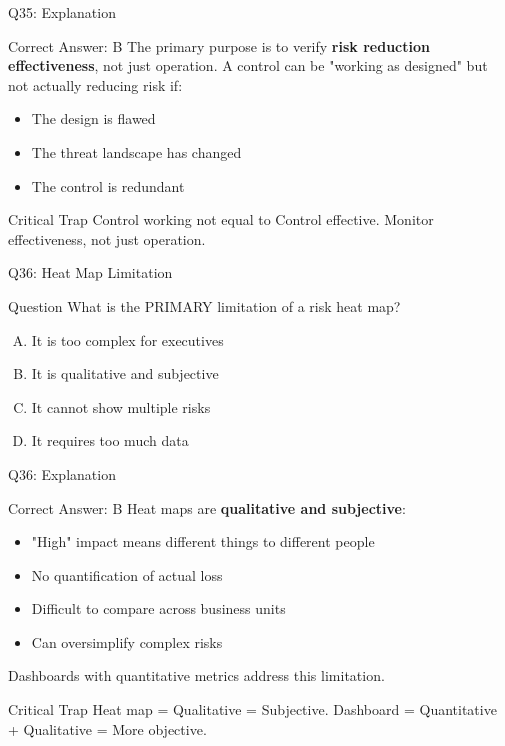 \documentclass{beamer}
\begin{document}
	\begin{frame}{Q35: Explanation}
		\begin{block}{Correct Answer: B}
			The primary purpose is to verify \textbf{risk reduction effectiveness}, not just operation. A control can be "working as designed" but not actually reducing risk if:
			\begin{itemize}
				\item The design is flawed
				\item The threat landscape has changed
				\item The control is redundant
			\end{itemize}
		\end{block}
		\begin{alertblock}{Critical Trap}
			Control working not equal to Control effective.
			Monitor effectiveness, not just operation.
		\end{alertblock}
	\end{frame}
	
	\begin{frame}{Q36: Heat Map Limitation}
		\begin{block}{Question}
			What is the PRIMARY limitation of a risk heat map?
		\end{block}
		\begin{enumerate}[(A)]
			\item It is too complex for executives
			\item It is qualitative and subjective
			\item It cannot show multiple risks
			\item It requires too much data
		\end{enumerate}
	\end{frame}
	
	\begin{frame}{Q36: Explanation}
		\begin{block}{Correct Answer: B}
			Heat maps are \textbf{qualitative and subjective}:
			\begin{itemize}
				\item "High" impact means different things to different people
				\item No quantification of actual loss
				\item Difficult to compare across business units
				\item Can oversimplify complex risks
			\end{itemize}
			Dashboards with quantitative metrics address this limitation.
		\end{block}
		\begin{alertblock}{Critical Trap}
			Heat map = Qualitative = Subjective.
			Dashboard = Quantitative + Qualitative = More objective.
		\end{alertblock}
	\end{frame}
	
\end{document}
